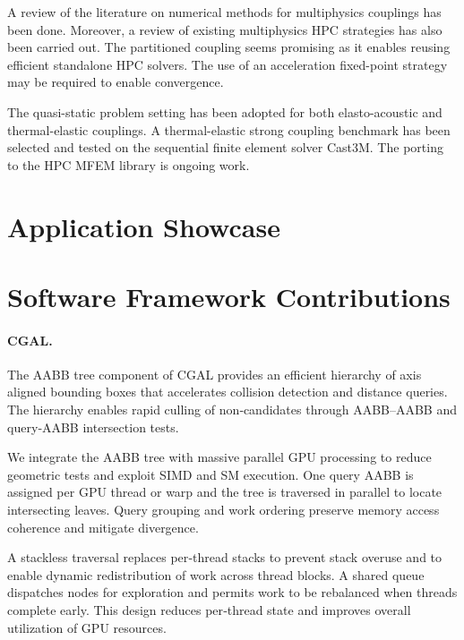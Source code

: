 A review of the literature on numerical methods for multiphysics couplings has been done. Moreover, a review of existing multiphysics HPC strategies has also been carried out. The partitioned coupling seems promising as it enables reusing efficient standalone HPC solvers. The use of an acceleration fixed-point strategy may be required to enable convergence.

The quasi-static problem setting has been adopted for both elasto-acoustic and thermal-elastic couplings. A thermal-elastic strong coupling benchmark has been selected and tested on the sequential finite element solver Cast3M. The porting to the HPC MFEM library is ongoing work.



\section{Application Showcase}

%   

\section{Software Framework Contributions}

\paragraph{CGAL.} The AABB tree component of CGAL provides an efficient hierarchy of axis aligned bounding boxes that accelerates collision detection and distance queries. The hierarchy enables rapid culling of non‑candidates through AABB–AABB and query‑AABB intersection tests.  

We integrate the AABB tree with massive parallel GPU processing to reduce geometric tests and exploit SIMD and SM execution. One query AABB is assigned per GPU thread or warp and the tree is traversed in parallel to locate intersecting leaves. Query grouping and work ordering preserve memory access coherence and mitigate divergence.  

A stackless traversal replaces per‑thread stacks to prevent stack overuse and to enable dynamic redistribution of work across thread blocks. A shared queue dispatches nodes for exploration and permits work to be rebalanced when threads complete early. This design reduces per‑thread state and improves overall utilization of GPU resources.  

